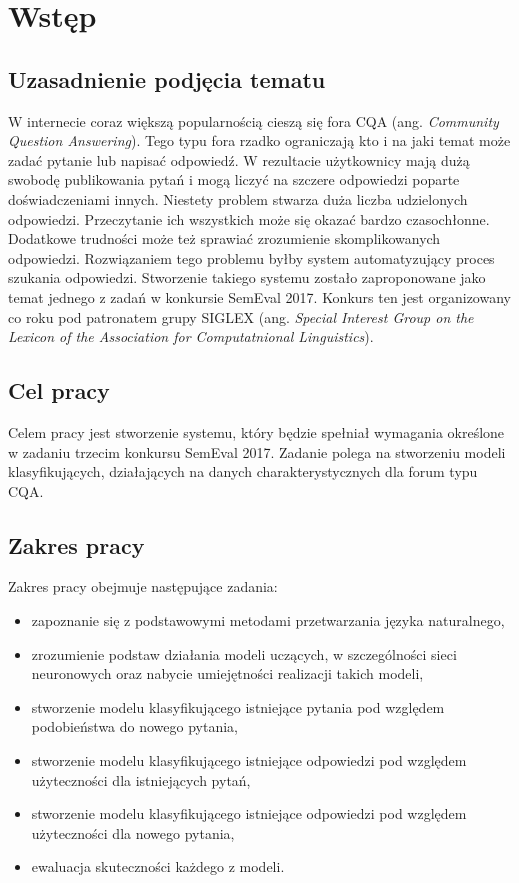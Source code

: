 \chapter{Wstęp}

\section{Uzasadnienie podjęcia tematu}
W internecie coraz większą popularnością cieszą się fora CQA (ang. \textit{Community Question Answering}). Tego typu fora rzadko ograniczają kto i na jaki temat może zadać pytanie lub napisać odpowiedź. W rezultacie użytkownicy mają dużą swobodę publikowania pytań i mogą liczyć na szczere odpowiedzi poparte doświadczeniami innych. Niestety problem stwarza duża liczba udzielonych odpowiedzi. Przeczytanie ich wszystkich może się okazać bardzo czasochłonne. Dodatkowe trudności może też sprawiać zrozumienie skomplikowanych odpowiedzi. Rozwiązaniem tego problemu byłby system automatyzujący proces szukania odpowiedzi.
Stworzenie takiego systemu zostało zaproponowane jako temat jednego z zadań w konkursie SemEval 2017. \cite{SemEval-2017:task3} Konkurs ten jest organizowany co roku pod patronatem grupy SIGLEX (ang. \textit{Special Interest Group on the Lexicon of the Association for Computatnional Linguistics}). 

\section{Cel pracy}
Celem pracy jest stworzenie systemu, który będzie spełniał wymagania określone w zadaniu trzecim konkursu SemEval 2017. Zadanie polega na stworzeniu modeli klasyfikujących, działających na danych charakterystycznych dla forum typu CQA. %

\section{Zakres pracy}
Zakres pracy obejmuje następujące zadania:
\begin{itemize}
  \item zapoznanie się z podstawowymi metodami przetwarzania języka naturalnego,
  \item zrozumienie podstaw działania modeli uczących, w szczególności sieci neuronowych oraz nabycie umiejętności realizacji takich modeli,
  \item stworzenie modelu klasyfikującego istniejące pytania pod względem podobieństwa do nowego pytania,
  \item stworzenie modelu klasyfikującego istniejące odpowiedzi pod względem użyteczności dla istniejących pytań,
  \item stworzenie modelu klasyfikującego istniejące odpowiedzi pod względem użyteczności dla nowego pytania,
  \item ewaluacja skuteczności każdego z modeli.
\end{itemize}

